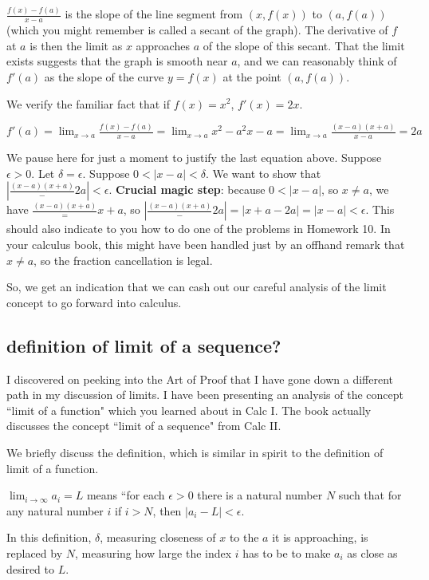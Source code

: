 \documentclass[12pt]{article}
\begin{document}
$\frac{f(x)-f(a)}{x-a}$ is the slope of the line segment from $(x,f(x))$ to $(a,f(a))$ (which you might remember is called a secant of the graph).  The derivative of $f$ at $a$ is then the limit as $x$ approaches $a$ of the slope of this secant.  That the limit exists suggests that the graph is smooth near $a$, and we can reasonably think of $f'(a)$ as the slope of the curve $y=f(x)$ at the point $(a,f(a))$.

We verify the familiar fact that if $f(x)=x^2$, $f'(x)=2x$.

$f'(a) = \lim_{x \rightarrow a}\frac{f(x)-f(a)}{x-a} = \lim_{x \rightarrow a}{x^2-a^2}{x-a} = \lim_{x \rightarrow a}\frac{(x-a)(x+a)}{x-a}=2a$

We pause here for just a moment to justify the last equation above.   Suppose $\epsilon>0$.  Let $\delta=\epsilon$.  Suppose $0<|x-a|<\delta$.  We want to show that
$|\frac{(x-a)(x+a)} - 2a| <\epsilon$.  {\bf Crucial magic step}:  because $0<|x-a|$, so $x\neq a$, we have $\frac{(x-a)(x+a)}=x+a$,
so $|\frac{(x-a)(x+a)} - 2a|=|x+a-2a|=|x-a|<\epsilon$.  This should also indicate to you how to do one of the problems in Homework 10.  In your calculus book, this might have been handled just by an offhand remark that $x \neq a$, so the fraction cancellation is legal.

So, we get an indication that we can cash out our careful analysis of the limit concept to go forward into calculus.

\subsection{definition of limit of a sequence?}  I discovered on peeking into the Art of Proof that I have gone down a different path in my discussion of limits.  I have been presenting an analysis of the concept ``limit of a function" which you learned about in Calc I.  The book actually discusses the concept ``limit of a sequence" from Calc II.

We briefly discuss the definition, which is similar in spirit to the definition of limit of a function.

$\lim_{i \rightarrow \infty}a_i = L$ means ``for each $\epsilon>0$ there is a natural number $N$ such that for any natural number $i$ if $i>N$, then $|a_i-L|<\epsilon$.

In this definition, $\delta$, measuring closeness of $x$ to the $a$ it is approaching, is replaced by $N$, measuring how large the index $i$ has to be to make $a_i$ as close as desired to $L$.
\end{document}
